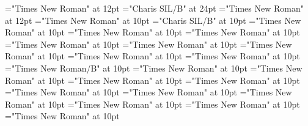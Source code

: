 \documentclass[a4paper]{article}
\begin{document}
 
\pagestyle{plain} 
\font{}="Times New Roman" at 12pt
\font{}="Charis SIL/B" at 24pt
\font{}="Times New Roman" at 12pt
\font\entryletDatadicBody="Times New Roman" at 10pt
\font\headwordmcbentryletDatadicBody="Charis SIL/B" at 10pt
\font\sensesentryletDatadicBody="Times New Roman" at 10pt
\font\sensesensesentryletDatadicBody="Times New Roman" at 10pt
\font\LexSensepublishStemPossessiveFormsensesensesentryletDatadicBody="Times New Roman" at 10pt
\font\grammaticalinfosensesensesentryletDatadicBody="Times New Roman" at 10pt
\font\partofspeechesgrammaticalinfosensesensesentryletDatadicBody="Times New Roman" at 10pt
\font\spanespartofspeechesgrammaticalinfosensesensesentryletDatadicBody="Times New Roman" at 10pt
\font\subsensessensesensesentryletDatadicBody="Times New Roman" at 10pt
\font\sensesubsensessensesensesentryletDatadicBody="Times New Roman" at 10pt
\font\xsensenumbersensesubsensessensesensesentryletDatadicBody="Times New Roman/B" at 10pt
\font\grammaticalinfosensesubsensessensesensesentryletDatadicBody="Times New Roman" at 10pt
\font\partofspeechesgrammaticalinfosensesubsensessensesensesentryletDatadicBody="Times New Roman" at 10pt
\font\spanespartofspeechesgrammaticalinfosensesubsensessensesensesentryletDatadicBody="Times New Roman" at 10pt
\font{}="Times New Roman" at 10pt
\font\spanesdefinitionessensesubsensessensesensesentryletDatadicBody="Times New Roman" at 10pt
\font\LexSensepublishStemSocioLinguisticsNotePubessensesubsensessensesensesentryletDatadicBody="Times New Roman" at 10pt
\font\spanesLexSensepublishStemSocioLinguisticsNotePubessensesubsensessensesensesentryletDatadicBody="Times New Roman" at 10pt
\font\spanmcbLexSensepublishStemSocioLinguisticsNotePubessensesubsensessensesensesentryletDatadicBody="Times New Roman" at 10pt
\font\EmphasizedTextesLexSensepublishStemSocioLinguisticsNotePubessensesubsensessensesensesentryletDatadicBody="Times New Roman" at 10pt
\font\FocusedmcbLexSensepublishStemSocioLinguisticsNotePubessensesubsensessensesensesentryletDatadicBody="Times New Roman" at 10pt
\end{document}

